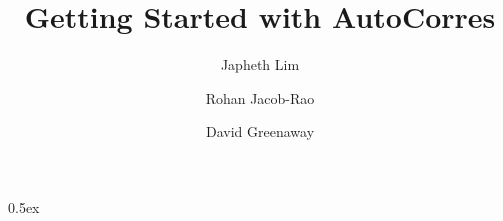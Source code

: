 \documentclass[11pt,a4paper]{article}
\begin{document}
\title{Getting Started with AutoCorres}
\author{Japheth Lim \and Rohan Jacob-Rao \and David Greenaway}
\maketitle

\tableofcontents
\clearpage

\parindent 0pt\parskip 0.5ex




\nocite{*}

\end{document}
